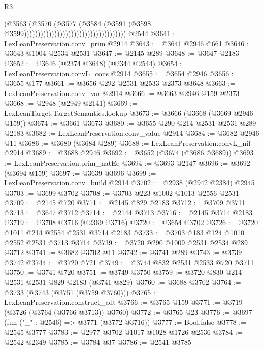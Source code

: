\begin{lexlean}{R3}
\begin{coremodule}
                                                                  (@3563
                                                                    (@3570
                                                                      (@3577
                                                                        (@3584
                                                                          (@3591
                                                                            (@3598
                                                                              @3599)))))))))))))))))))))))))))))))))))))
    @2544
@3641 := LexLeanPreservation.conv_prim @2914
@3643 := @3641 @2946 @661
@3646 := @3643 @1004 @2534 @2531
@3647 := @2145 @289
@3648 := @3647 @2183
@3652 := @3646 (@2374 @3648) (@2344 @2544)
@3654 := LexLeanPreservation.convL_cons @2914
@3655 := @3654 @2946
@3656 := @3655 @177
@3661 := @3656 @292 @2531 @2533 @2373 @3648
@3663 := LexLeanPreservation.conv_var @2914
@3666 := @3663 @2946 @159 @2373
@3668 := @2948 (@2949 @2141)
@3669 := LexLeanTarget.TargetSemantics.lookup
@3673 := @3666 (@3668 (@3669 @2946 @159))
@3674 := @3661 @3673
@3680 := @3655 @290 @214 @2531 @2531 @289 @2183
@3682 := LexLeanPreservation.conv_value @2914
@3684 := @3682 @2946 @11
@3686 := @3680 (@3684 @289)
@3688 := LexLeanPreservation.convL_nil @2914
@3689 := @3688 @2946
@3692 := @3652 (@3674 (@3686 @3689))
@3693 := LexLeanPreservation.prim_natEq
@3694 := @3693 @2147
@3696 := @3692 (@3694 @159)
@3697 := @3639 @3696
@3699 := LexLeanPreservation.conv_build @2914
@3702 := @2938 (@2942 @2384) @2945
@3703 := @3699 @3702
@3708 := @3703 @223 @1002 @1013 @2556 @2531
@3709 := @2145 @720
@3711 := @2145 @829 @2183
@3712 := @3709 @3711
@3713 := @3647 @3712
@3714 := @2144 @3713
@3716 := @2145 @3714 @2183
@3719 := @3708 @3716 (@2369 @3716)
@3720 := @3654 @3702
@3726 := @3720 @1011 @214 @2554 @2531 @3714 @2183
@3733 := @3703 @183 @124 @1010 @2552 @2531 @3713 @3714
@3739 := @3720 @290 @1009 @2531 @2534 @289 @3712
@3741 := @3682 @3702 @11
@3742 := @3741 @289
@3743 := @3739 @3742
@3744 := @3720 @721
@3749 := @3744 @832 @2531 @2533 @720 @3711
@3750 := @3741 @720
@3751 := @3749 @3750
@3759 := @3720 @830 @214 @2531 @2531 @829 @2183 (@3741 @829)
@3760 := @3688 @3702
@3764 := @3733 (@3743 (@3751 (@3759 @3760)))
@3765 := LexLeanPreservation.construct_adt
@3766 := @3765 @159
@3771 := @3719 (@3726 (@3764 (@3766 @3713)) @3760)
@3772 := @3765 @23
@3776 := @3697 (fun ("_" : @2546) => @3771 (@3772 @3716))
@3777 := Bool.false
@3778 := @2545 @3777
@3783 := @2977 @3702 @1017 @1028 @1726 @2536
@3784 := @2542 @2349
@3785 := @3784 @37
@3786 := @2541 @3785

\end{coremodule}
\end{lexlean}
